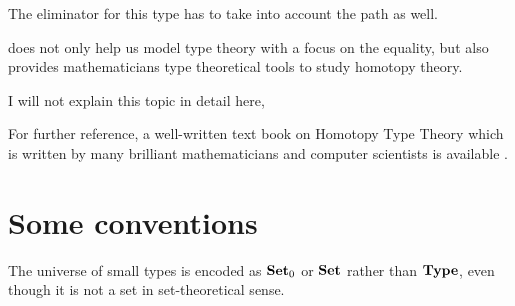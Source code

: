 The eliminator for this type has to take into account the path as well.

\hott does not only help us model type theory with a focus on the equality, but also provides mathematicians type theoretical tools to study homotopy theory.




I will not explain this topic in detail here, 


For further reference, a well-written text book on Homotopy Type Theory which is written by many brilliant mathematicians and computer
scientists is available \cite{hott}. 



\section{Some conventions}


The universe of small types is encoded as $\operatorname{\mathbf{Set}}_{0}$ or $\operatorname{\mathbf{Set}}$ rather than $\operatorname{\mathbf{Type}}$, even though it is not a set in set-theoretical sense.



